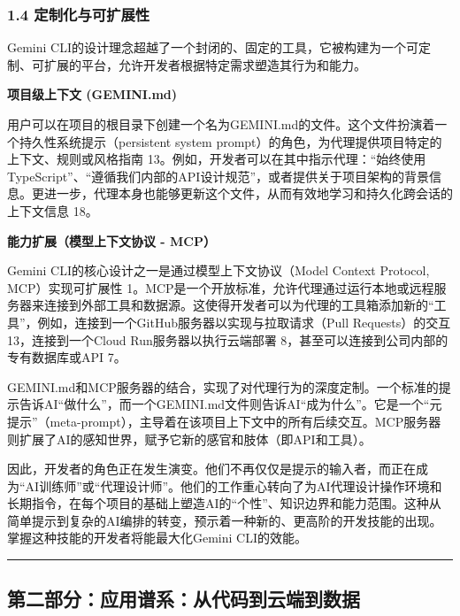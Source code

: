 \documentclass[a4paper,12pt]{article}
\begin{document}
\begin{multicols}{2}
    \subsubsection{\texorpdfstring{\textbf{1.4
    定制化与可扩展性}}{1.4 定制化与可扩展性}}\label{ux5b9aux5236ux5316ux4e0eux53efux6269ux5c55ux6027}

    Gemini
    CLI的设计理念超越了一个封闭的、固定的工具，它被构建为一个可定制、可扩展的平台，允许开发者根据特定需求塑造其行为和能力。

    \textbf{项目级上下文 (GEMINI.md)}

    用户可以在项目的根目录下创建一个名为GEMINI.md的文件。这个文件扮演着一个持久性系统提示（persistent
    system prompt）的角色，为代理提供项目特定的上下文、规则或风格指南
    13。例如，开发者可以在其中指示代理：``始终使用TypeScript''、``遵循我们内部的API设计规范''，或者提供关于项目架构的背景信息。更进一步，代理本身也能够更新这个文件，从而有效地学习和持久化跨会话的上下文信息
    18。

    \textbf{能力扩展（模型上下文协议 - MCP）}

    Gemini CLI的核心设计之一是通过模型上下文协议（Model Context
    Protocol, MCP）实现可扩展性
    1。MCP是一个开放标准，允许代理通过运行本地或远程服务器来连接到外部工具和数据源。这使得开发者可以为代理的工具箱添加新的``工具''，例如，连接到一个GitHub服务器以实现与拉取请求（Pull
    Requests）的交互 13，连接到一个Cloud Run服务器以执行云端部署
    8，甚至可以连接到公司内部的专有数据库或API 7。

    GEMINI.md和MCP服务器的结合，实现了对代理行为的深度定制。一个标准的提示告诉AI``做什么''，而一个GEMINI.md文件则告诉AI``成为什么''。它是一个``元提示''（meta-prompt），主导着在该项目上下文中的所有后续交互。MCP服务器则扩展了AI的感知世界，赋予它新的感官和肢体（即API和工具）。

    因此，开发者的角色正在发生演变。他们不再仅仅是提示的输入者，而正在成为``AI训练师''或``代理设计师''。他们的工作重心转向了为AI代理设计操作环境和长期指令，在每个项目的基础上塑造AI的``个性''、知识边界和能力范围。这种从简单提示到复杂的AI编排的转变，预示着一种新的、更高阶的开发技能的出现。掌握这种技能的开发者将能最大化Gemini
    CLI的效能。

    \begin{center}\rule{0.5\linewidth}{0.5pt}\end{center}

    \subsection{\texorpdfstring{\textbf{第二部分：应用谱系：从代码到云端到数据}}{第二部分：应用谱系：从代码到云端到数据}}\label{ux7b2cux4e8cux90e8ux5206ux5e94ux7528ux8c31ux7cfbux4eceux4ee3ux7801ux5230ux4e91ux7aefux5230ux6570ux636e}


\end{multicols}
\end{document}

